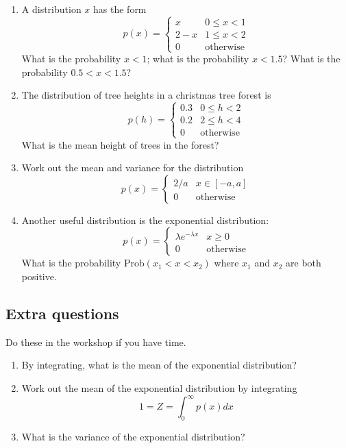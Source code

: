 \documentclass[11pt,a4paper]{scrartcl}
\begin{document}
\begin{enumerate}

\item A distribution $x$ has the form
\begin{equation}
p(x)=\left\{\begin{array}{cc}x& 0\le x <1\\2-x& 1\le x<2\\0&\mbox{otherwise}\end{array}\right.
\end{equation}
What is the probability $x<1$; what is the probability $x<1.5$? What is the probability $0.5<x<1.5$? 
  
\item The distribution of tree heights in a christmas tree forest is 
\begin{equation}
p(h)=\left\{\begin{array}{cc}0.3& 0\le h <2\\0.2& 2\le h<4\\0&\mbox{otherwise}\end{array}\right.
\end{equation}
What is the mean height of trees in the forest?

\item Work out the mean and variance for the distribution
  \begin{equation}
    p(x)=\left\{\begin{array}{ll}2/a&x\in [-a,a]\\0&\mbox{otherwise}\end{array}\right.
  \end{equation}

\item Another useful distribution is the exponential distribution:
$$
p(x)=\left\{\begin{array}{cc}\lambda e^{-\lambda x}& x\ge 0\\ 0&\mbox{otherwise}\end{array}\right.
$$
What is the probability $\mbox{Prob}(x_1 < x <x_2)$ where $x_1$ and $x_2$ are both positive.


  
  

\end{enumerate}

\subsection*{Extra questions}

Do these in the workshop if you have time.

\begin{enumerate}

\item By integrating, what is the mean of the exponential distribution? 

\item Work out the mean of the exponential distribution by integrating
  $$1=Z=\int_0^{\infty} p(x)dx$$

\item What is the variance of the exponential distribution?
  
\end{enumerate}
\end{document}
